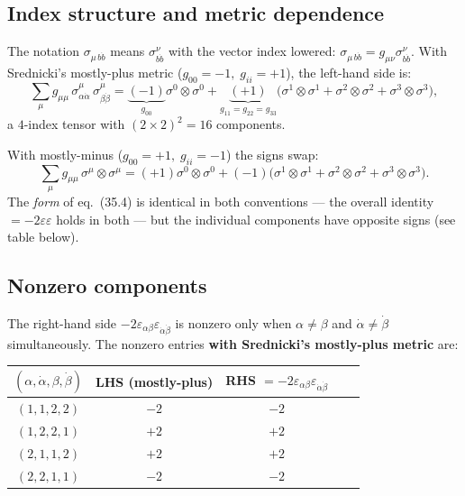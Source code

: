 \documentclass[12pt]{article}
\begin{document}
\subsection{Index structure and metric dependence}

The notation $\sigma_{\mu\,b\dot{b}}$ means $\sigma^\nu_{b\dot{b}}$ with
the vector index lowered: $\sigma_{\mu\,b\dot{b}} = g_{\mu\nu}\sigma^\nu_{b\dot{b}}$.
With Srednicki's mostly-plus metric ($g_{00}=-1,\; g_{ii}=+1$), the left-hand side is:
\[
  \sum_\mu g_{\mu\mu}\,\sigma^\mu_{\alpha\dot{\alpha}}\,\sigma^\mu_{\beta\dot{\beta}}
  = \underbrace{(-1)}_{{g_{00}}}\sigma^0\!\otimes\!\sigma^0
    + \underbrace{(+1)}_{{g_{11}=g_{22}=g_{33}}}\bigl(\sigma^1\!\otimes\!\sigma^1
    + \sigma^2\!\otimes\!\sigma^2
    + \sigma^3\!\otimes\!\sigma^3\bigr),
\]
a $4$-index tensor with $(2\times2)^2 = 16$ components.

\begin{metricnote}
With mostly-minus ($g_{00}=+1,\; g_{ii}=-1$) the signs swap:
\[
  \sum_\mu g_{\mu\mu}\,\sigma^\mu\!\otimes\!\sigma^\mu
  = (+1)\sigma^0\!\otimes\!\sigma^0
    + (-1)\bigl(\sigma^1\!\otimes\!\sigma^1
    + \sigma^2\!\otimes\!\sigma^2
    + \sigma^3\!\otimes\!\sigma^3\bigr).
\]
The \emph{form} of eq.~(35.4) is identical in both conventions --- the
overall identity $= -2\varepsilon\varepsilon$ holds in both --- but the
individual components have opposite signs (see table below).
\end{metricnote}

\subsection{Nonzero components}

The right-hand side $-2\varepsilon_{\alpha\beta}\varepsilon_{\dot\alpha\dot\beta}$
is nonzero only when $\alpha\neq\beta$ and $\dot\alpha\neq\dot\beta$
simultaneously.  The nonzero entries \textbf{with Srednicki's mostly-plus
metric} are:

\medskip
\begin{center}
\begin{tabular}{@{}ccccc@{}}
  \toprule
  $(\alpha,\dot\alpha,\beta,\dot\beta)$ &
  LHS (mostly-plus) & RHS $= -2\varepsilon_{\alpha\beta}\varepsilon_{\dot\alpha\dot\beta}$ \\
  \midrule
  $(1,1,2,2)$ & $-2$ & $-2$ \\
  $(1,2,2,1)$ & $+2$ & $+2$ \\
  $(2,1,1,2)$ & $+2$ & $+2$ \\
  $(2,2,1,1)$ & $-2$ & $-2$ \\
  \bottomrule
\end{tabular}
\end{center}
\end{document}
